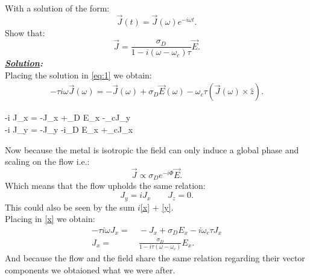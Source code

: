 \documentclass[notitlepage]{report}
\begin{document}
\begin{question}[title = Question 3.2]{}{}
With a solution of the form:\\
\[
\vec{J}\left(t\right)=\vec{J}\left(\omega\right) e^{-i\omega t} 
.\] 
Show that:\\
\[
\vec{J}=\frac{\sigma_D}{1-i\left(\omega-\omega_c\right)\tau }\vec{E}
.\] 
\tcblower
\textbf{\emph{\underline{Solution}:}}\\
Placing the solution in \eqref{eq:1} we obtain:\\
\begin{align*}
	-\tau i\omega \vec{J}\left(\omega\right) = -\vec{J}\left(\omega\right)+\sigma_D \vec{E}\left(\omega\right)-\omega_c\tau\left(\vec{J}\left(\omega\right)\times\hat{z} \right)
.\end{align*}
		\begin{numcases}{\Rightarrow }
			-\tau i \omega J_x =  -J_x +\sigma_D E_x -\omega_c\tau J_y\label{x}\\
		-\tau i \omega J_y =  -J_y -i\sigma_D E_x +\omega_c\tau J_x\label{y}
	\end{numcases}
Now because the metal is isotropic the field can only induce 
a global phase and scaling on the flow i.e.:\\
\[
	\vec{J}\propto\sigma_D e^{-i\Phi}\vec{E}
.\] 
Which means that the flow upholds the same relation:
\[
	J_y=iJ_x\qquad J_z=0
.\] 
This could also be seen by the sum $i$\eqref{x} + \eqref{y}.\\
Placing in \eqref{x} we obtain:\\
\begin{align*}
	-\tau i \omega J_x =&\  -J_x +\sigma_D E_x -i\omega_c\tau J_x\\
	J_x=&\ \frac{\sigma_D}{1-i\tau\left(\omega -\omega_c\right)} E_x
.\end{align*}
And because the flow and the field share the same relation regarding their vector 
components we obtaioned what we were after.
\end{question}
\end{document}
